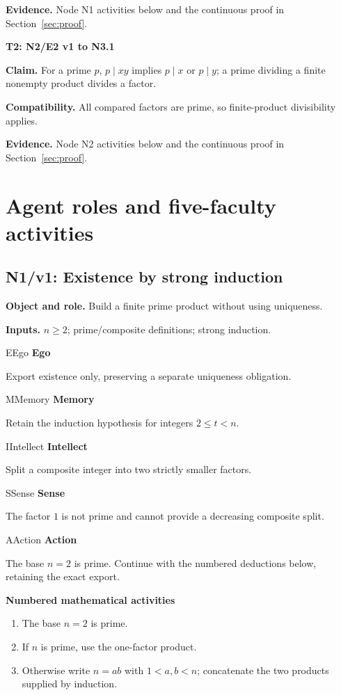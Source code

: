\documentclass[preprint,12pt,aps,pra,showkeys,amsmath,amssymb,superscriptaddress,floatfix]{revtex4-2}
\theoremstyle{definition}
\theoremstyle{remark}
\newcommand{\mmfaculty}[3]{%
 \begin{mmfacultybox}{#1}{#2}
 {\sffamily\bfseries\color{MMBlue}#2}\par\smallskip #3
 \end{mmfacultybox}}
\newcommand{\field}[2]{\par\smallskip\noindent\textbf{#1.} #2\par}
\begin{document}
\field{Evidence}{Node N1 activities below and the continuous proof in Section~\ref{sec:proof}.}

\smallskip\noindent\textbf{T2: N2/E2 v1 to N3.1}

\field{Claim}{For a prime \(p\), \(p\mid xy\) implies \(p\mid x\) or \(p\mid y\); a
prime dividing a finite nonempty product divides a factor.}

\field{Compatibility}{All compared factors are prime, so finite-product divisibility applies.}

\field{Evidence}{Node N2 activities below and the continuous proof in Section~\ref{sec:proof}.}

\endgroup

\clearpage\section{Agent roles and five-faculty activities}

\subsection{N1/v1: Existence by strong induction}

\field{Object and role}{Build a finite prime product without using uniqueness.}

\field{Inputs}{\(n\ge2\); prime/composite definitions; strong induction.}

\mmfaculty{E}{Ego}{Export existence only, preserving a separate uniqueness obligation.}

\mmfaculty{M}{Memory}{Retain the induction hypothesis for integers \(2\le t<n\).}

\mmfaculty{I}{Intellect}{Split a composite integer into two strictly smaller factors.}

\mmfaculty{S}{Sense}{The factor \(1\) is not prime and cannot provide a decreasing composite
split.}

\mmfaculty{A}{Action}{The base \(n=2\) is prime. Continue with the numbered deductions below,
retaining the exact export.}

\smallskip\noindent\textbf{Numbered mathematical activities}

\begin{enumerate}[label=N1.\arabic*,leftmargin=3.4em]

\item The base \(n=2\) is prime.

\item If \(n\) is prime, use the one-factor product.

\item Otherwise write \(n=ab\) with \(1<a,b<n\); concatenate the two products
supplied by induction.

\end{enumerate}
\end{document}

